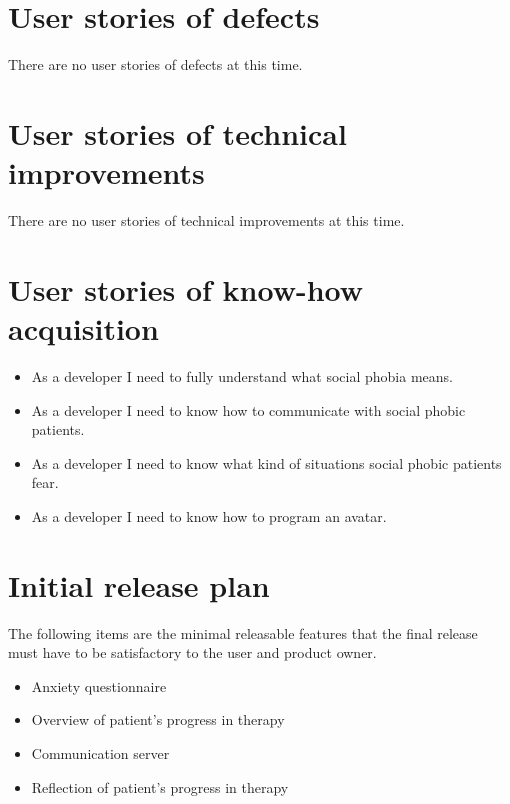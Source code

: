 \section{User stories of defects}
There are no user stories of defects at this time.

\section{User stories of technical improvements}
There are no user stories of technical improvements at this time.

\section{User stories of know-how acquisition}
\begin{itemize}
\item As a developer I need to fully understand what social phobia means.
\item As a developer I need to know how to communicate with social phobic patients.
\item As a developer I need to know what kind of situations social phobic patients fear.
\item As a developer I need to know how to program an \gls{avatar}.
\end{itemize}

\section{Initial release plan}
The following items are the minimal releasable features that the final release must have to be satisfactory to the user and product owner.

\begin{itemize}
\item Anxiety questionnaire 
\item Overview of patient's progress in therapy
\item Communication server
\item Reflection of patient's progress in therapy
\end{itemize} 
